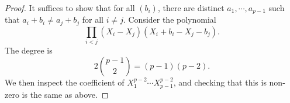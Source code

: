 \documentclass[a4paper]{article}
\begin{document}
\begin{proof}
  It suffices to show that for all $(b_i)$, there are distinct $a_1, \cdots, a_{p - 1}$ such that $a_i + b_i \not= a_j + b_j$ for all $i \not= j$. Consider the polynomial
  \[
    \prod_{i < j} (X_i - X_j)(X_i + b_i - X_j - b_j).
  \]
  The degree is
  \[
    2 \binom{p - 1}{2} = (p - 1)(p - 2).
  \]
  We then inspect the coefficient of $X_1^{p - 2} \cdots X_{p - 1}^{p - 2}$, and checking that this is non-zero is the same as above.
\end{proof}

\printindex
\end{document}
